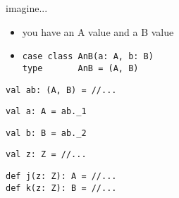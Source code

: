 \documentclass[include/preamble.tex]{subfiles}
\begin{document}
\begin{frame}[fragile]
  \begin{flushleft}
      imagine...
    \begin{itemize}
      \item you have an A value and a B value
        \pause
      \item[]
        \begin{lstlisting}[style=scala]
case class AnB(a: A, b: B)
type       AnB = (A, B)
        \end{lstlisting}
    \end{itemize}
  \end{flushleft}
\end{frame}

\begin{frame}[fragile]
  \begin{center}

    \begin{lrbox}{\boxA}
      \begin{lstlisting}[style=scala]
val ab: (A, B) = //...
      \end{lstlisting}
    \end{lrbox}

    \begin{lrbox}{\boxB}
      \begin{lstlisting}[style=scala]
val a: A = ab._1
      \end{lstlisting}
    \end{lrbox}

    \begin{lrbox}{\boxC}
      \begin{lstlisting}[style=scala]
val b: B = ab._2
      \end{lstlisting}
    \end{lrbox}

    \begin{lrbox}{\boxD}
      \begin{lstlisting}[style=scala]
val z: Z = //...
      \end{lstlisting}
    \end{lrbox}

    \begin{lrbox}{\boxE}
      \begin{lstlisting}[style=scala]
def j(z: Z): A = //...
def k(z: Z): B = //...
      \end{lstlisting}
    \end{lrbox}


\end{center}
\end{frame}
\end{document}

